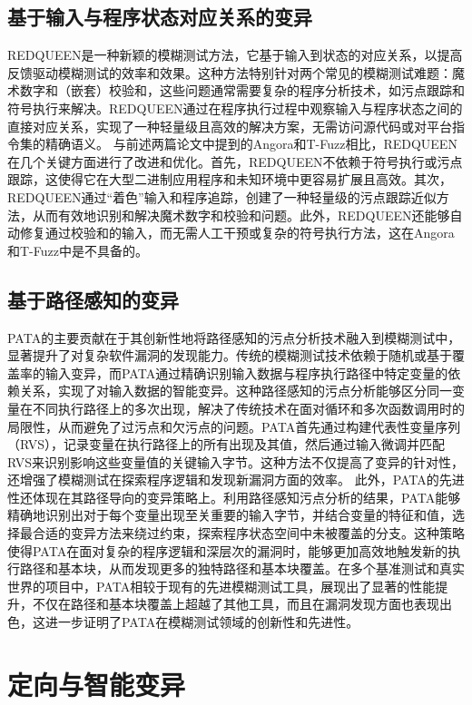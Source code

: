 \documentclass[10.5pt,compsoc]{CjC}
\theoremstyle{mystyle}
\begin{document}
\subsection{基于输入与程序状态对应关系的变异}
REDQUEEN\cite{redqueen}是一种新颖的模糊测试方法，它基于输入到状态的对应关系，以提高反馈驱动模糊测试的效率和效果。这种方法特别针对两个常见的模糊测试难题：魔术数字和（嵌套）校验和，这些问题通常需要复杂的程序分析技术，如污点跟踪和符号执行来解决。REDQUEEN通过在程序执行过程中观察输入与程序状态之间的直接对应关系，实现了一种轻量级且高效的解决方案，无需访问源代码或对平台指令集的精确语义。
	与前述两篇论文中提到的Angora和T-Fuzz相比，REDQUEEN在几个关键方面进行了改进和优化。首先，REDQUEEN不依赖于符号执行或污点跟踪，这使得它在大型二进制应用程序和未知环境中更容易扩展且高效。其次，REDQUEEN通过“着色”输入和程序追踪，创建了一种轻量级的污点跟踪近似方法，从而有效地识别和解决魔术数字和校验和问题。此外，REDQUEEN还能够自动修复通过校验和的输入，而无需人工干预或复杂的符号执行方法，这在Angora和T-Fuzz中是不具备的。
  \vspace {10mm}
  
\subsection{基于路径感知的变异}
PATA\cite{PATA}的主要贡献在于其创新性地将路径感知的污点分析技术融入到模糊测试中，显著提升了对复杂软件漏洞的发现能力。传统的模糊测试技术依赖于随机或基于覆盖率的输入变异，而PATA通过精确识别输入数据与程序执行路径中特定变量的依赖关系，实现了对输入数据的智能变异。这种路径感知的污点分析能够区分同一变量在不同执行路径上的多次出现，解决了传统技术在面对循环和多次函数调用时的局限性，从而避免了过污点和欠污点的问题。PATA首先通过构建代表性变量序列（RVS），记录变量在执行路径上的所有出现及其值，然后通过输入微调并匹配RVS来识别影响这些变量值的关键输入字节。这种方法不仅提高了变异的针对性，还增强了模糊测试在探索程序逻辑和发现新漏洞方面的效率。
此外，PATA的先进性还体现在其路径导向的变异策略上。利用路径感知污点分析的结果，PATA能够精确地识别出对于每个变量出现至关重要的输入字节，并结合变量的特征和值，选择最合适的变异方法来绕过约束，探索程序状态空间中未被覆盖的分支。这种策略使得PATA在面对复杂的程序逻辑和深层次的漏洞时，能够更加高效地触发新的执行路径和基本块，从而发现更多的独特路径和基本块覆盖。在多个基准测试和真实世界的项目中，PATA相较于现有的先进模糊测试工具，展现出了显著的性能提升，不仅在路径和基本块覆盖上超越了其他工具，而且在漏洞发现方面也表现出色，这进一步证明了PATA在模糊测试领域的创新性和先进性。
\vspace {10mm}

\section{定向与智能变异}
\end{document}
